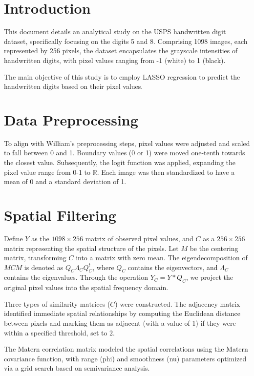 \documentclass[12pt]{article}
\begin{document}
\section*{Introduction}

This document details an analytical study on the USPS handwritten digit dataset, specifically focusing on the digits 5 and 8. Comprising 1098 images, each represented by 256 pixels, the dataset encapsulates the grayscale intensities of handwritten digits, with pixel values ranging from -1 (white) to 1 (black).

The main objective of this study is to employ LASSO regression to predict the handwritten digits based on their pixel values.

\section*{Data Preprocessing}

To align with William's preprocessing steps, pixel values were adjusted and scaled to fall between 0 and 1. Boundary values (0 or 1) were moved one-tenth towards the closest value. Subsequently, the logit function was applied, expanding the pixel value range from 0-1 to \(\mathbb{R}\). Each image was then standardized to have a mean of 0 and a standard deviation of 1.

\section*{Spatial Filtering}

Define \(Y\) as the \(1098 \times 256\) matrix of observed pixel values, and \(C\) as a \(256 \times 256\) matrix representing the spatial structure of the pixels. Let \(M\) be the centering matrix, transforming \(C\) into a matrix with zero mean. The eigendecomposition of \(MCM\) is denoted as \(Q_C \Lambda_C Q_C^t\), where \(Q_C\) contains the eigenvectors, and \(\Lambda_C\) contains the eigenvalues. Through the operation \(Y_C = Y * Q_C\), we project the original pixel values into the spatial frequency domain.

Three types of similarity matrices (\(C\)) were constructed. The adjacency matrix identified immediate spatial relationships by computing the Euclidean distance between pixels and marking them as adjacent (with a value of 1) if they were within a specified threshold, set to 2.

The Matern correlation matrix modeled the spatial correlations using the Matern covariance function, with range (phi) and smoothness (nu) parameters optimized via a grid search based on semivariance analysis.
\end{document}
